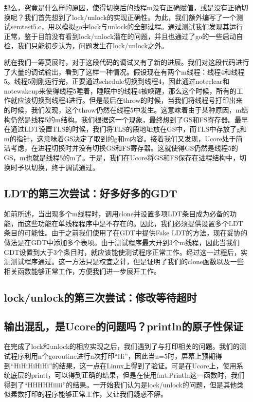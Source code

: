 \documentclass{article}
\begin{document}
那么，究竟是什么样的原因，使得切换后的线程m没有正确赋值，或是没有正确切换呢？我们首先想到了lock/unlock的实现正确性。为此，我们额外编写了一个测试semtest5.c，用以模拟go中lock与unlock的全部过程。通过测试我们发现其运行正常，鉴于目前没有看到lock/unlock潜在的问题，并且也通过了go的一些启动自检，我们只能初步认为，问题发生在lock/unlock之外。

就在我们一筹莫展时，对于这段代码的调试又有了新的进展。我们对这段代码进行了大量的调试输出，看到了这样一种情况。假设现在有两个m线程：线程4和线程5。线程5刚刚运行完，正要通过schedule切换到线程4，因此通过noteclear和notewakeup来使得线程5睡着，睡眠中的线程4被唤醒，那么这个时候，所有的工作就应该切换到线程4进行。但是最后在throw的时候，当我们将线程号打印出来的时候，我们发现，这个throw仍然在线程5中发生。这意味着由于某种原因，m结构仍然是线程5的m结构。我们根据这一个现象，最终想到了GS和FS寄存器。最早在通过LDT设置TLS的时候，我们将TLS的段地址放在GS中，而TLS中存放了g和m的指针，这意味着GS决定了取到的g和m内容。接着我们又发现，Ucore处于简洁考虑，在进程切换时并没有切换GS和FS寄存器。这就使得GS仍然是线程5的GS，m也就是线程5的m了。于是，我们在Ucore将GS和FS保存在进程结构中，切换时予以切换，终于调试通过。

\subsection{LDT的第三次尝试：好多好多的GDT}
如前所述，当出现多个m线程时，调用clone并设置多项LDT条目成为必备的功能，而这些功能在单线程程序中是不存在的。因此，我们必须提供设置多个LDT条目的可能性。由于之前我们使用了在GDT中提供Fake LDT的方法，现在妥协的做法是在GDT中添加多个表项。由于测试程序最大开到3个m线程，因此当我们GDT设置到大于3个条目时，就应该能使测试程序正常工作。经过这一过程后，实测测试程序通过。这一方法只是权宜之计，但是证明了我们的clone函数以及一些相关函数能够正常工作，方便我们进一步展开工作。

\subsection{lock/unlock的第三次尝试：修改等待超时}

\subsection{输出混乱，是Ucore的问题吗？println的原子性保证}
在完成了lock和unlock的相应实现之后，我们遇到了与打印相关的问题。我们的测试程序利用n个goroutine进行n次打印“Hi”，因此当n=5时，屏幕上预期得到“HiHiHiHiHi”的结果，这一点在Linux上得到了验证。可是在Ucore上，使用系统底层的printf，可以得到正确的结果，但是在使用fmt.Println这一函数时，我们得到了“HHHHHiiiii”的结果。一开始我们认为是lock/unlock的问题，但是其他类似素数打印的程序能够正常工作，又让我们疑惑不解。
\end{document}
